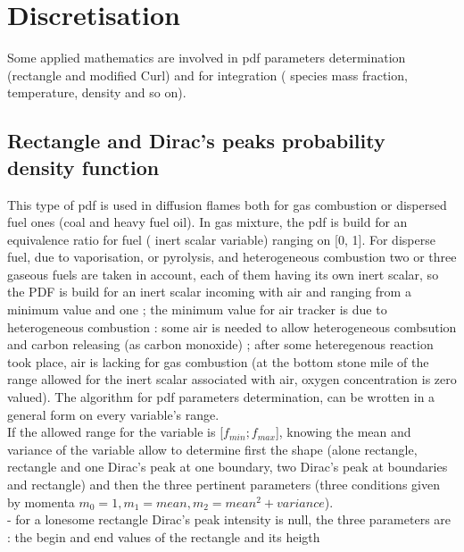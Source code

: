 \section{Discretisation}

Some applied mathematics are involved in pdf parameters determination
({\small rectangle and modified Curl}) and for integration ({\small
species mass fraction, temperature, density and so on}).\\

\subsection{Rectangle and Dirac's peaks probability density function}

This type of pdf is used in diffusion flames both for gas combustion
or dispersed fuel ones ({\small coal and heavy fuel oil}). In gas
mixture, the pdf is build for an equivalence ratio for fuel ({\small
inert scalar variable}) ranging on [0, 1]. For disperse fuel, due to
vaporisation, or pyrolysis, and heterogeneous combustion two or three
gaseous fuels are taken in account, each of them having its own inert
scalar, so the PDF is build for an inert scalar incoming with air and
ranging from a minimum value and one ; the minimum value for air
tracker is due to heterogeneous combustion : some air is needed to
allow heterogeneous combsution and carbon releasing ({\small as carbon
monoxide}) ; after some heteregenous reaction took place, air is
lacking for gas combustion ({\small at the bottom stone mile of the
range allowed for the inert scalar associated with air, oxygen
concentration is zero valued}). The algorithm for pdf parameters
determination, can be wrotten in a general form on every variable's
range.\\

If the allowed range for the variable is [$f_{min} ; f_{max}$],
knowing the mean and variance of the variable allow to determine first
the shape ({\small alone rectangle, rectangle and one Dirac's peak at
one boundary, two Dirac's peak at boundaries and rectangle}) and then
the three pertinent parameters ({\small three conditions given by
momenta $m_{0}=1, m_{1}=mean, m_{2}=mean^{2}+variance$}).\\

- for a lonesome rectangle Dirac's peak intensity is null, the three
  parameters are : the begin and end values of the rectangle and its
  heigth\\

